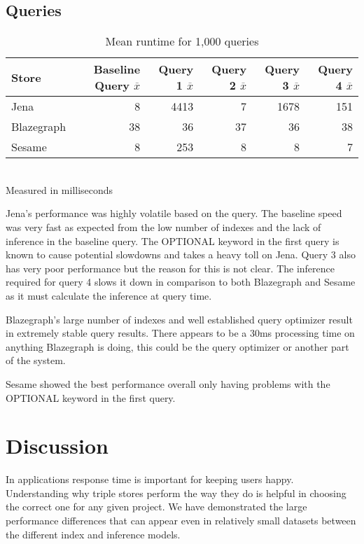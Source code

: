\documentclass{llncs}
\begin{document}
\subsection{Queries}
\begin{table}
\begin{center}
\caption{Mean runtime for 1,000 queries}
\begin{tabular}{l | r r r r r}
    Store & Baseline Query $\overline{x}$ & Query 1 $\overline{x}$ & Query 2 $\overline{x}$ & Query 3 $\overline{x}$ & Query 4 $\overline{x}$ \\
\hline
Jena & 8 & 4413 & 7 & 1678 & 151 \\
Blazegraph & 38 & 36 & 37 & 36 & 38 \\
Sesame & 8 & 253 & 8 & 8 & 7
\end{tabular}
\\[5pt]
Measured in milliseconds
\end{center}
\end{table}

Jena's performance was highly volatile based on the query.  The baseline speed was very fast as expected from the low number of indexes and the lack of inference in the baseline query.  The OPTIONAL keyword in the first query is known to cause potential slowdowns and takes a heavy toll on Jena.  Query 3 also has very poor performance but the reason for this is not clear.  The inference required for query 4 slows it down in comparison to both Blazegraph and Sesame as it must calculate the inference at query time.

Blazegraph's large number of indexes and well established query optimizer result in extremely stable query results.  There appears to be a 30ms processing time on anything Blazegraph is doing, this could be the query optimizer or another part of the system. 

Sesame showed the best performance overall only having problems with the OPTIONAL keyword in the first query.

\section{Discussion}
In applications response time is important for keeping users happy.  Understanding why triple stores perform the way they do is helpful in choosing the correct one for any given project.  We have demonstrated the large performance differences that can appear even in relatively small datasets between the different index and inference models.



\end{document}
